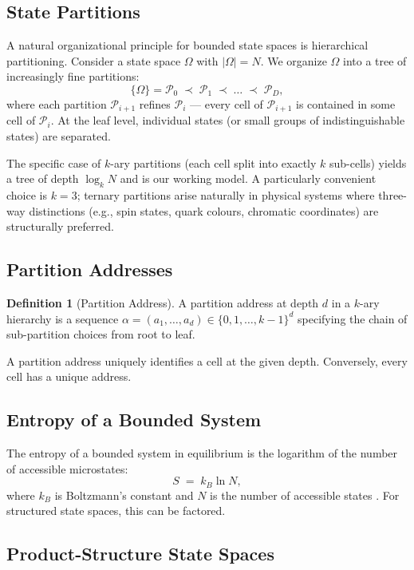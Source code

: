 \documentclass[11pt,twocolumn,a4paper]{article}
\theoremstyle{definition}
\newtheorem{definition}[theorem]{Definition}
\theoremstyle{remark}
\newcommand{\Pc}{\mathcal{P}}
\begin{document}
\subsection{State Partitions}

A natural organizational principle for bounded state spaces is hierarchical partitioning. Consider a state space $\Omega$ with $|\Omega| = N$. We organize $\Omega$ into a tree of increasingly fine partitions:
\[
\{\Omega\} = \Pc_0 \;\prec\; \Pc_1 \;\prec\; \ldots \;\prec\; \Pc_D,
\]
where each partition $\Pc_{i+1}$ refines $\Pc_i$ --- every cell of $\Pc_{i+1}$ is contained in some cell of $\Pc_i$. At the leaf level, individual states (or small groups of indistinguishable states) are separated.

The specific case of $k$-ary partitions (each cell split into exactly $k$ sub-cells) yields a tree of depth $\log_k N$ and is our working model. A particularly convenient choice is $k = 3$; ternary partitions arise naturally in physical systems where three-way distinctions (e.g., spin states, quark colours, chromatic coordinates) are structurally preferred.

\subsection{Partition Addresses}

\begin{definition}[Partition Address]
\label{def:address}
A partition address at depth $d$ in a $k$-ary hierarchy is a sequence $\alpha = (a_1, \ldots, a_d) \in \{0, 1, \ldots, k-1\}^d$ specifying the chain of sub-partition choices from root to leaf.
\end{definition}

A partition address uniquely identifies a cell at the given depth. Conversely, every cell has a unique address.

\subsection{Entropy of a Bounded System}

The entropy of a bounded system in equilibrium is the logarithm of the number of accessible microstates:
\[
S \;=\; k_B \ln N,
\]
where $k_B$ is Boltzmann's constant and $N$ is the number of accessible states \citep{boltzmann1872further}. For structured state spaces, this can be factored.

\subsection{Product-Structure State Spaces}
\end{document}
